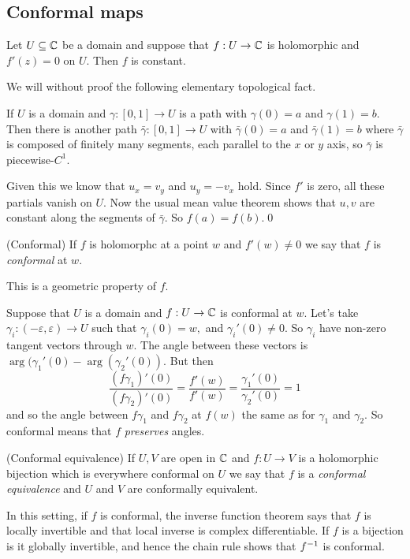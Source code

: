 \documentclass{article}
\begin{document}
\subsection{Conformal maps}
\begin{proposition}
  Let $ U\subseteq \mathbb{C} $ be a domain and suppose that $ f:U\to\mathbb{C} $ is holomorphic and $ f'(z)=0 $ on $ U $. Then $ f $ is constant.
\end{proposition}
\pf We will without proof the following elementary topological fact.
\begin{lemma}
	If $ U $ is a domain and $ \gamma:[0,1]\to U $ is a path with $ \gamma(0)=a $ and $ \gamma(1)=b $. Then there is another path $ \bar\gamma:[0,1]\to U $ with $ \bar\gamma(0)=a $ and $ \bar\gamma(1)=b $ where $ \bar\gamma $ is composed of finitely many segments, each parallel to the $ x $ or $ y $ axis, so $ \bar\gamma $ is piecewise-$ C^1 $.
\end{lemma}
Given this we know that $ u_x = v_y $ and $ u_y=-v_x $ hold. Since $ f' $ is zero, all these partials vanish on $ U $. Now the usual mean value theorem shows that $ u,v $ are constant along the segments of $ \bar\gamma $. So $ f(a)=f(b) $.\qed
\begin{definition}
	(Conformal) If $ f $ is holomorphc at a point $ w $ and $ f'(w)\ne 0 $ we say that $ f $ is \textit{conformal} at $ w $.
\end{definition}
This is a geometric property of $ f $.
\par
Suppose that $ U $ is a domain and $ f: U\to \mathbb{C} $ is conformal at $ w $. Let's take $ \gamma_i:(-\varepsilon,\varepsilon)\to U $ such that $ \gamma_i(0)=w, $ and $ \gamma_i'(0)\ne 0 $. So $ \gamma_i $ have non-zero tangent vectors through $ w $. The angle between these vectors is $ \arg(\gamma_1'(0)-\arg(\gamma_2'(0)) $. But then
\[
	\frac{(f\gamma_1)'(0)}{(f\gamma_2)'(0)} = \frac{f'(w)}{f'(w)}=\frac{\gamma_1'(0)}{\gamma_2'(0)}=1
\]
and so the angle between $ f\gamma_1 $ and $ f\gamma_2 $ at $ f(w) $ the same as for $ \gamma_1 $ and $ \gamma_2 $. So conformal means that $ f $ \textit{preserves} angles.
\begin{definition}
	(Conformal equivalence) If $ U,V $ are open in $ \mathbb{C} $ and $ f:U\to V $ is a holomorphic bijection which is everywhere conformal on $ U $ we say that $ f $ is a \textit{conformal equivalence} and $ U $ and $ V $ are conformally equivalent.
\end{definition}
\begin{remark}
  In this setting, if $ f $ is conformal, the inverse function theorem says that $ f $ is locally invertible and that local inverse is complex differentiable. If $ f $ is a bijection is it globally invertible, and hence the chain rule shows that $ {f}^{-1} $ is conformal.
\end{remark}
\end{document}
